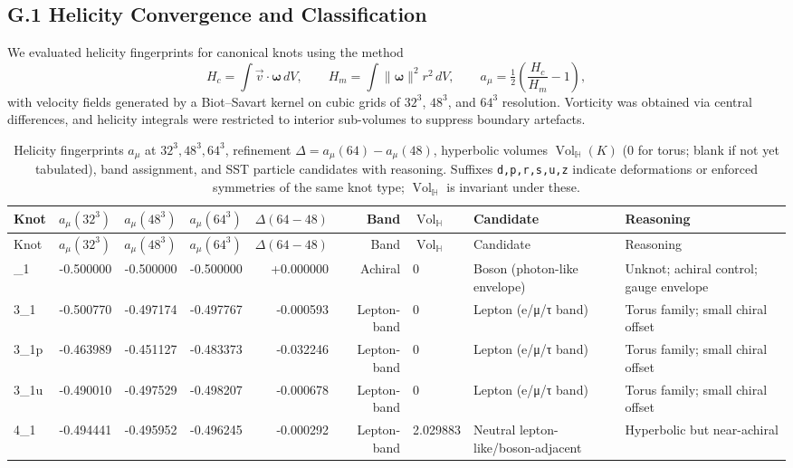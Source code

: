 \documentclass[smallextended]{svjour3}       %
\newcommand{\Vol}{\operatorname{Vol}}   %
\begin{document}
    \subsection*{G.1 Helicity Convergence and Classification}

    We evaluated helicity fingerprints for canonical knots using the method
    \[
        H_c = \int \vec v \cdot \boldsymbol{\omega}\, dV,
        \qquad
        H_m = \int \|\boldsymbol{\omega}\|^2 r^2 \, dV,
        \qquad
        a_\mu = \tfrac12\left(\frac{H_c}{H_m}-1\right),
    \]
    with velocity fields generated by a Biot–Savart kernel on cubic grids of $32^3$, $48^3$, and $64^3$ resolution. Vorticity was obtained via central differences, and helicity integrals were restricted to interior sub-volumes to suppress boundary artefacts.

    \begin{longtable}{lrrrrrllp{6.8cm}}
    \caption{Helicity fingerprints $a_\mu$ at $32^3,48^3,64^3$, refinement $\Delta=a_\mu(64)-a_\mu(48)$, hyperbolic volumes $\Vol_{\!\mathbb{H}}(K)$ (0 for torus; blank if not yet tabulated), band assignment, and SST particle candidates with reasoning. Suffixes \texttt{d,p,r,s,u,z} indicate deformations or enforced symmetries of the same knot type; $\Vol_{\!\mathbb{H}}$ is invariant under these.}\\
    \toprule
    Knot & $a_\mu(32^3)$ & $a_\mu(48^3)$ & $a_\mu(64^3)$ & $\Delta(64{-}48)$ & Band & $\Vol_{\!\mathbb{H}}$ & Candidate & Reasoning \\
    \midrule
    \endfirsthead
    \toprule
    Knot & $a_\mu(32^3)$ & $a_\mu(48^3)$ & $a_\mu(64^3)$ & $\Delta(64{-}48)$ & Band & $\Vol_{\!\mathbb{H}}$ & Candidate & Reasoning \\
    \midrule
    \endhead
    \bottomrule
    \endlastfoot
    1\_1 & -0.500000 & -0.500000 & -0.500000 & +0.000000 & Achiral & 0 & Boson (photon-like envelope) & Unknot; achiral control; gauge envelope \\
    3\_1 & -0.500770 & -0.497174 & -0.497767 & -0.000593 & Lepton-band & 0 & Lepton (e/μ/τ band) & Torus family; small chiral offset \\
    3\_1p & -0.463989 & -0.451127 & -0.483373 & -0.032246 & Lepton-band & 0 & Lepton (e/μ/τ band) & Torus family; small chiral offset \\
    3\_1u & -0.490010 & -0.497529 & -0.498207 & -0.000678 & Lepton-band & 0 & Lepton (e/μ/τ band) & Torus family; small chiral offset \\
    4\_1 & -0.494441 & -0.495952 & -0.496245 & -0.000292 & Lepton-band & 2.029883 & Neutral lepton-like/boson-adjacent & Hyperbolic but near-achiral \\

\end{longtable}
\end{document}
